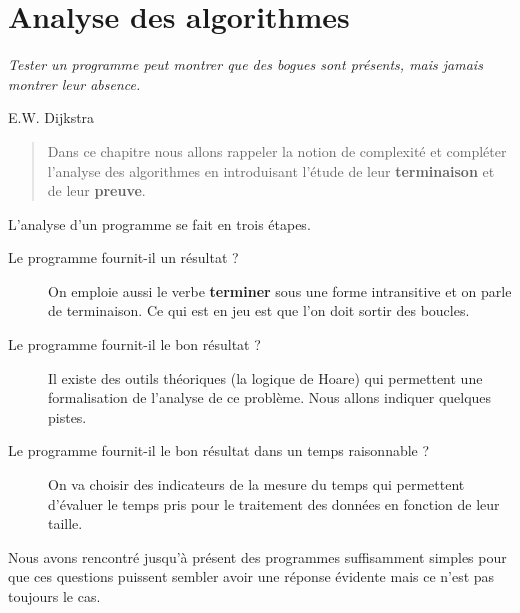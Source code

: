 \chapter{Analyse des algorithmes}

{\it Tester un programme peut montrer que des bogues sont
présents, mais jamais montrer leur absence.} 

\hfill E.W. Dijkstra

\medskip
\begin{abstract}
    Dans ce chapitre nous allons rappeler la notion de complexité et compléter l'analyse des algorithmes en introduisant l'étude de leur {\bf terminaison} et de leur {\bf preuve}. 
\end{abstract}

\medskip

L'analyse d'un programme se fait en trois étapes.
\begin{description}
\item[Le programme fournit-il un résultat ?]

On emploie aussi le verbe {\bf terminer} sous une forme intransitive et on parle de terminaison.
Ce qui est en jeu est que l'on doit sortir des boucles.

\item[Le programme fournit-il le bon résultat ?]

Il existe des outils théoriques (la logique de Hoare) qui permettent une formalisation de l'analyse de ce problème. Nous allons indiquer quelques pistes.

\item[Le programme fournit-il le bon résultat dans un temps raisonnable ?]

On va choisir des indicateurs de la mesure du temps qui permettent d'évaluer le temps pris pour le traitement des données en fonction de leur taille.
\end{description}
Nous avons rencontré jusqu'à présent des programmes suffisamment simples pour que ces questions puissent sembler avoir une réponse évidente mais ce n'est pas toujours le cas. 

